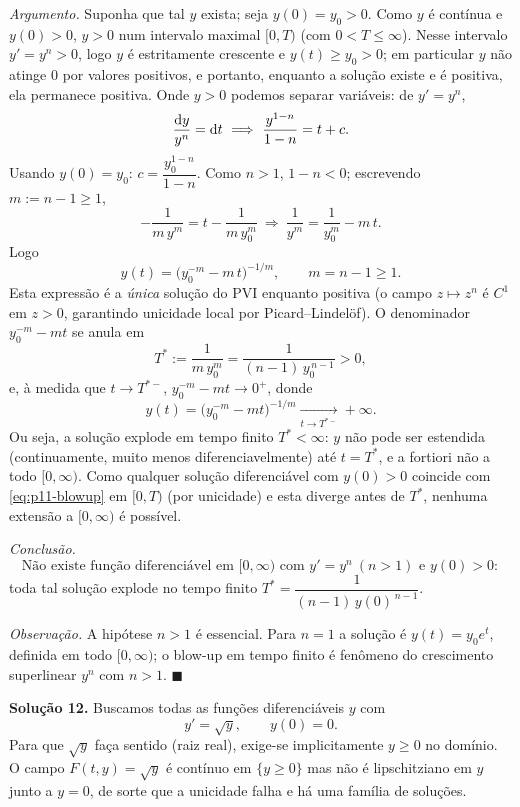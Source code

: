 \emph{Argumento.} Suponha que tal $y$ exista; seja $y(0)=y_0>0$. Como $y$ é contínua e $y(0)>0$, $y>0$ num intervalo maximal $[0,T)$ (com $0<T\le\infty$). Nesse intervalo $y'=y^n>0$, logo $y$ é estritamente crescente e $y(t)\ge y_0>0$; em particular $y$ não atinge $0$ por valores positivos, e portanto, enquanto a solução existe e é positiva, ela permanece positiva. Onde $y>0$ podemos separar variáveis: de $y'=y^n$,
\[
\frac{\d y}{y^n}=\d t\ \Longrightarrow\ \frac{y^{1-n}}{1-n}=t+c .
\]
Usando $y(0)=y_0$: $c=\dfrac{y_0^{1-n}}{1-n}$. Como $n>1$, $1-n<0$; escrevendo $m:=n-1\ge1$,
\[
-\frac1{m\,y^{m}}=t-\frac1{m\,y_0^{m}}
\ \Longrightarrow\
\frac1{y^{m}}=\frac1{y_0^{m}}-m\,t .
\]
Logo
\begin{equation}\label{eq:p11-blowup}
y(t)=\Big(y_0^{-m}-m\,t\Big)^{-1/m},\qquad m=n-1\ge1 .
\end{equation}
Esta expressão é a \emph{única} solução do PVI enquanto positiva (o campo $z\mapsto z^n$ é $C^1$ em $z>0$, garantindo unicidade local por Picard--Lindelöf). O denominador $y_0^{-m}-mt$ se anula em
\[
T^*:=\frac{1}{m\,y_0^{m}}=\frac{1}{(n-1)\,y_0^{\,n-1}}>0,
\]
e, à medida que $t\to T^{*-}$, $y_0^{-m}-mt\to0^+$, donde
\[
y(t)=\big(y_0^{-m}-mt\big)^{-1/m}\xrightarrow[t\to T^{*-}]{}+\infty .
\]
Ou seja, a solução explode em tempo finito $T^*<\infty$: $y$ não pode ser estendida (continuamente, muito menos diferenciavelmente) até $t=T^*$, e a fortiori não a todo $[0,\infty)$. Como qualquer solução diferenciável com $y(0)>0$ coincide com \eqref{eq:p11-blowup} em $[0,T)$ (por unicidade) e esta diverge antes de $T^*$, nenhuma extensão a $[0,\infty)$ é possível.

\emph{Conclusão.}
\[
\boxed{\text{Não existe função diferenci\'avel em }[0,\infty)\text{ com }y'=y^n\ (n>1)\text{ e }y(0)>0:}
\]
toda tal solução explode no tempo finito $T^*=\dfrac{1}{(n-1)\,y(0)^{\,n-1}}$.

\emph{Observação.} A hipótese $n>1$ é essencial. Para $n=1$ a solução é $y(t)=y_0e^{t}$, definida em todo $[0,\infty)$; o blow-up em tempo finito é fenômeno do crescimento superlinear $y^n$ com $n>1$.
\qquad$\blacksquare$


\bigskip\noindent\textbf{Solução 12.}\quad
Buscamos todas as funções diferenciáveis $y$ com
\[
y'=\sqrt y,\qquad y(0)=0 .
\]
Para que $\sqrt y$ faça sentido (raiz real), exige-se implicitamente $y\ge0$ no domínio. O campo $F(t,y)=\sqrt y$ é contínuo em $\{y\ge0\}$ mas não é lipschitziano em $y$ junto a $y=0$, de sorte que a unicidade falha e há uma família de soluções.

